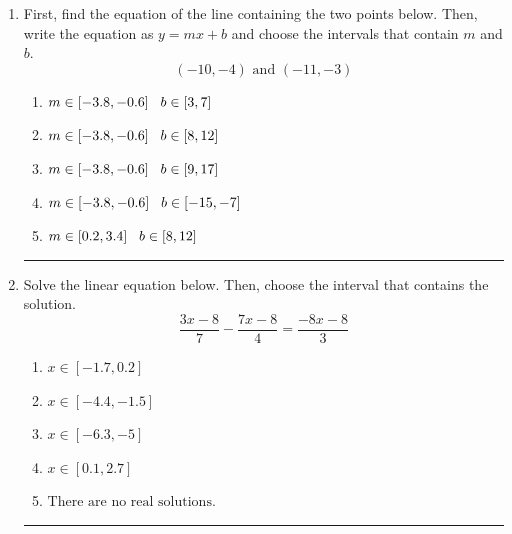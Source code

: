 \documentclass[14pt]{extbook}
\newcommand{\litem}[1]{\item#1\hspace*{-1cm}\rule{\textwidth}{0.4pt}}
\begin{document}
\begin{enumerate}
{\begin{enumerate}[label=\Alph*.]
\end{enumerate} }
\litem{
First, find the equation of the line containing the two points below. Then, write the equation as $ y=mx+b $ and choose the intervals that contain $m$ and $b$.\[ (-10, -4) \text{ and } (-11, -3) \]\begin{enumerate}[label=\Alph*.]
\item \( m \in [-3.8, -0.6] \hspace*{3mm} b \in [3, 7] \)
\item \( m \in [-3.8, -0.6] \hspace*{3mm} b \in [8, 12] \)
\item \( m \in [-3.8, -0.6] \hspace*{3mm} b \in [9, 17] \)
\item \( m \in [-3.8, -0.6] \hspace*{3mm} b \in [-15, -7] \)
\item \( m \in [0.2, 3.4] \hspace*{3mm} b \in [8, 12] \)

\end{enumerate} }
\litem{
Solve the linear equation below. Then, choose the interval that contains the solution.\[ \frac{3x -8}{7} - \frac{7x -8}{4} = \frac{-8x -8}{3} \]\begin{enumerate}[label=\Alph*.]
\item \( x \in [-1.7, 0.2] \)
\item \( x \in [-4.4, -1.5] \)
\item \( x \in [-6.3, -5] \)
\item \( x \in [0.1, 2.7] \)
\item \( \text{There are no real solutions.} \)


\end{enumerate}}
\end{enumerate}
\end{document}
